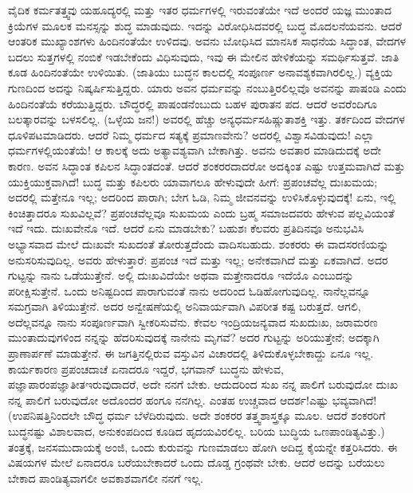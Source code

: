 ವೈದಿಕ ಕರ್ಮತತ್ತ್ವವು ಯಹೂದ್ಯರಲ್ಲಿ ಮತ್ತು ಇತರ ಧರ್ಮಗಳಲ್ಲಿ ಇರುವಂತೆಯೇ ಇದೆ \enginline{-} ಅಂದರೆ ಯಜ್ಞ ಮುಂತಾದ ಕ್ರಿಯೆಗಳ ಮೂಲಕ ಮನಸ್ಸನ್ನು ಶುದ್ಧ ಮಾಡುವುದು. ಇದನ್ನು ವಿರೋಧಿಸಿದವರಲ್ಲಿ ಬುದ್ಧ ಮೊದಲನೆಯವನು. ಆದರೆ ಆಂತರಿಕ ಮುಖ್ಯಾಂಶಗಳು ಹಿಂದಿನಂತೆಯೇ ಉಳಿದವು. ಅವನು ಬೋಧಿಸಿದ ಮಾನಸಿಕ ಸಾಧನೆಯ ಸಿದ್ಧಾಂತ, ವೇದಗಳ ಬದಲು ಸುತ್ತಗಳಲ್ಲಿ ನಂಬಿಕೆ ಇಡಬೇಕೆಂದು ವಿಧಿಸುವುದು, ಇವು ಈ ಮೇಲಿನ ಹೇಳಿಕೆಯನ್ನು ಸಮರ್ಥಿಸುತ್ತವೆ. ಜಾತಿ ಕೂಡ ಹಿಂದಿನಂತೆಯೇ ಉಳಿಯಿತು. (ಜಾತಿಯು ಬುದ್ಧನ ಕಾಲದಲ್ಲಿ ಸಂಪೂರ್ಣ ಅನಾವಶ್ಯಕವಾಗಿರಲಿಲ್ಲ.) ವ್ಯಕ್ತಿಯ ಗುಣದಿಂದ ಅದನ್ನು ನಿಷ್ಕರ್ಷಿಸುತ್ತಿದ್ದರು. ಯಾರು ಅವನ ಧರ್ಮವನ್ನು ನಂಬುತ್ತಿರಲಿಲ್ಲವೊ ಅವನನ್ನು ಪಾಷಂಡಿ ಎಂದು ಹಿಂದಿನಂತೆಯೆ ಕರೆಯುತ್ತಿದ್ದರು. ಬೌದ್ಧರಲ್ಲಿ ಪಾಷಂಡನೆಂಬುದು ಬಹಳ ಪುರಾತನ ಪದ. ಆದರೆ ಅವರೆಂದಿಗೂ ಬಲತ್ಕಾರವನ್ನು ಬಳಸಲಿಲ್ಲ. (ಒಳ್ಳೆಯ ಜನ!) ಅವರಲ್ಲಿ ಹೆಚ್ಚು ಅನ್ಯಧರ್ಮಸಹಿಷ್ಣುತಾಶಕ್ತಿ ಇತ್ತು. ತರ್ಕದಿಂದ ವೇದಗಳ ಧೂಳಿಪಟಮಾಡಿದರು. ಆದರೆ ನಿಮ್ಮ ಧರ್ಮದ ಸತ್ಯಕ್ಕೆ ಪ್ರಮಾಣವೇನು? ಅದರಲ್ಲಿ ವಿಶ್ವಾಸವಿಡುವುದು! ಎಲ್ಲಾ ಧರ್ಮಗಳಲ್ಲಿಯಂತೆಯೆ! ಆ ಕಾಲಕ್ಕೆ ಅದು ಅತ್ಯಾವಶ್ಯವಾಗಿ ಬೇಕಾಗಿತ್ತು. ಅವನು ಅವತಾರ ಮಾಡಿದುದಕ್ಕೆ ಅದೇ ಕಾರಣ. ಅವನ ಸಿದ್ಧಾಂತ ಕಪಿಲನ ಸಿದ್ಧಾಂತದಂತೆ. ಆದರೆ ಶಂಕರರದಾದರೋ ಅದಕ್ಕಿಂತ ಎಷ್ಟು ಉತ್ತಮವಾಗಿದೆ ಮತ್ತು ಯುಕ್ತಿಯುಕ್ತವಾಗಿದೆ! ಬುದ್ಧ ಮತ್ತು ಕಪಿಲರು ಯಾವಾಗಲೂ ಹೇಳುವುದೇ ಹೀಗೆ: ಪ್ರಪಂಚವೆಲ್ಲ ದುಃಖಮಯ; ಅದರಲ್ಲಿ ಮತ್ತೇನೂ ಇಲ್ಲ; ಅದರಿಂದ ಪಾರಾಗಿ; ಬೇಗ ಓಡಿ, ನಿಮ್ಮ ಜೀವನವನ್ನು ಉಳಿಸಿಕೊಳ್ಳುವುದಕ್ಕೆ! ಏನು, ಇಲ್ಲಿ ಕಿಂಚಿತ್ತಾದರೂ ಸುಖವಿಲ್ಲವೆ? ಪ್ರಪಂಚವೆಲ್ಲವೂ ಸುಖಮಯ ಎಂದು ಬ್ರಹ್ಮ ಸಮಾಜದವರು ಹೇಳುವ ಪಲ್ಲವಿಯಂತೆ ಇದೆ ಇದು. ದುಃಖವೇನೊ ಇದೆ. ಆದರೆ ಏನು ಮಾಡಬೇಕು? ಬಹುಶಃ ಕೆಲವರು ಪ್ರತಿದಿನವೂ ಅನುಭವಿಸಿ ಅಭ್ಯಾಸವಾದ ಮೇಲೆ ದುಃಖವೇ ಸುಖದಂತೆ ತೋರುತ್ತದೆಂದು ವಾದಿಸಬಹುದು. ಶಂಕರರು ಈ ವಾದಸರಣಿಯನ್ನು ಅನುಸರಿಸುವುದಿಲ್ಲ. ಅವರು ಹೇಳುತ್ತಾರೆ: ಪ್ರಪಂಚ ಇದೆ ಮತ್ತು ಇಲ್ಲ; ಅನೇಕವಾಗಿದೆ ಮತ್ತು ಏಕವಾಗಿದೆ. ಅದರ ಗುಟ್ಟನ್ನು ನಾನು ಒಡೆಯುತ್ತೇನೆ. ಅಲ್ಲಿ ದುಃಖವಿದೆಯೇ ಅಥವಾ ಮತ್ತೇನಾದರೂ ಇದೆಯೊ ಎಂಬುದನ್ನು ಪರೀಕ್ಷಿಸುತ್ತೇನೆ. ಒಂದು ಅನಿಷ್ಟದಿಂದ ಪಾರಾಗುವಂತೆ ನಾನು ಅದರಿಂದ ಓಡಿಹೋಗುವುದಿಲ್ಲ. ನಾನೆಲ್ಲವನ್ನೂ ಸಮಗ್ರವಾಗಿ ತಿಳಿಯುತ್ತೇನೆ. ಅದರ ಅನ್ವೇಷಣೆಯಲ್ಲಿ ಅನಿವಾರ್ಯವಾಗಿ ವಿಪರೀತ ಕಷ್ಟ ಬರುತ್ತದೆ. ಆಗಲಿ, ಅದೆಲ್ಲವನ್ನೂ ನಾನು ಸಂಪೂರ್ಣವಾಗಿ ಸ್ವೀಕರಿಸುವೆನು. ಕೇವಲ ಇಂದ್ರಿಯಜನ್ಯವಾದ ಸುಖ\enginline{-}ದುಃಖ, ಜರಾಮರಣ ಮುಂತಾದುವುಗಳಿಂದ ನನ್ನನ್ನು ಹೆದರಿಸುವುದಕ್ಕೆ ನಾನೇನು ಮೃಗವೆ? ಅದರ ಗುಟ್ಟನ್ನು ಅರಿಯುತ್ತೇನೆ; ಅದಕ್ಕಾಗಿ ಪ್ರಾಣಾರ್ಪಣೆ ಮಾಡುತ್ತೇನೆ. ಈ ಜಗತ್ತಿನಲ್ಲಿರುವ ವಸ್ತುವಿನ ವಿಚಾರದಲ್ಲಿ ತಿಳಿದುಕೊಳ್ಳಬೇಕಾದ್ದು ಏನೂ ಇಲ್ಲ. ಕಾರ್ಯಕಾರಣ ಪ್ರಪಂಚದಾಚೆ ಏನಾದರೂ ಇದ್ದರೆ, ಭಗವಾನ್ ಬುದ್ಧನು ಹೇಳುವ, ಪಜ್ಞಾಪಾರಂ\enginline{-}ಪಜ್ಞಾತೀತ\enginline{-}ಇರುವುದಾದರೆ, ಅದೇ ನನಗೆ ಬೇಕು. ಆದುದರಿಂದ ಸುಖ ನನ್ನ ಪಾಲಿಗೆ ಬರುವುದೋ ದುಃಖ ನನ್ನ ಪಾಲಿಗೆ ಬರುವುದೋ ಅದೊಂದರ ಹಂಗೂ ನನಗಿಲ್ಲ. ಎಂತಹ ಉಚ್ಚವಾದ ಆದರ್ಶ!ಎಷ್ಟು ಭವ್ಯವಾಗಿದೆ! (ಉಪನಿಷತ್ತಿನಿಂದಲೇ ಬೌದ್ಧ ಧರ್ಮ ಬೆಳೆದಿರುವುದು. ಅದೇ ಶಂಕರರ ತತ್ತ್ವಶಾಸ್ತ್ರಕ್ಕೂ ಮೂಲ. ಆದರೆ ಶಂಕರರಿಗೆ ಬುದ್ಧನಷ್ಟು ವಿಶಾಲವಾದ, ಅನುಕಂಪದಿಂದ ಕೂಡಿದ ಹೃದಯವಿರಲಿಲ್ಲ. ಬರಿಯ ಬುದ್ಧಿಯ ಒಣಪಾಂಡಿತ್ಯವಿತ್ತು.) ತಂತ್ರಕ್ಕೆ, ಜನಸಮುದಾಯಕ್ಕೆ ಅಂಜಿ, ಒಂದು ಕುರುವನ್ನು ಗುಣಮಾಡಲು ಹೋಗಿ ಅದಿದ್ದ ಕೈಯನ್ನೇ ಕತ್ತರಿಸಿದರು. ಈ ವಿಷಯಗಳ ಮೇಲೆ ಏನಾದರೂ ಬರೆಯಬೇಕಾದರೆ ಒಂದು ದೊಡ್ಡ ಗ್ರಂಥವೇ ಬೇಕು. ಆದರೆ ಅದನ್ನು ಬರೆಯಲು ಬೇಕಾದ ಪಾಂಡಿತ್ಯವಾಗಲೀ ಅವಕಾಶವಾಗಲೀ ನನಗೆ ಇಲ್ಲ.

